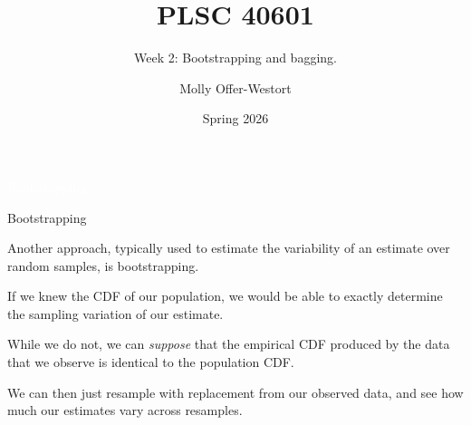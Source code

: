 \documentclass[xcolor={table}, handout]{beamer}
\title{PLSC 40601}
\subtitle{Week 2: Bootstrapping and bagging.}
\date{Spring 2026}
\author{Molly Offer-Westort}
\institute{Department of Political Science, \\University of Chicago}
\begin{document}



\frame{\titlepage
\thispagestyle{empty}
}
\begin{transitionframe}
\centering

\LARGE \textcolor{white}{Bootstrapping.}

\end{transitionframe}

\begin{frame}{Bootstrapping}


\begin{wideitemize}
\item Another approach, typically used to estimate the variability of an estimate over random samples, is bootstrapping.
\pause

\item If we knew the CDF of our population, we would be able to exactly determine the sampling variation of our estimate.
\pause

\item While we do not, we can  \textit{suppose} that the empirical CDF produced by the data that we observe is identical to the population CDF.
\pause

\item We can then just resample with replacement from our observed data, and see how much our estimates vary across resamples.
\end{wideitemize}

\end{frame}




\end{document}
